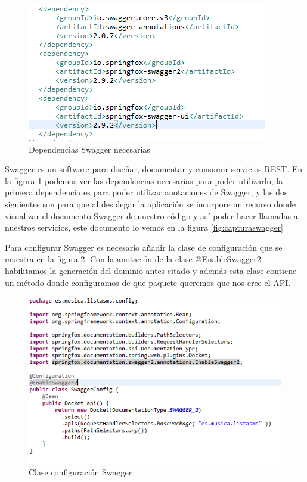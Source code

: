 \documentclass[12pt]{report} %
\begin{document}
\begin{figure}
	\centering
	\includegraphics[width=0.7\linewidth]{imagenes/dependenciasSwagger}
	\caption{Dependencias Swagger necesarias}
	\label{fig:dependenciasswagger}
\end{figure}

Swagger es un software para diseñar, documentar y consumir servicios REST. En la figura \ref{fig:dependenciasswagger} podemos ver las dependencias necesarias para poder utilizarlo, la primera dependencia es para poder utilizar anotaciones de Swagger, y las dos siguientes son para que al desplegar la aplicación se incorpore un recurso donde visualizar el documento Swagger de nuestro código y así poder hacer llamadas a nuestros servicios, este documento lo vemos en la figura \ref{fig:capturaswagger}

Para configurar Swagger es necesario añadir la clase de configuración que se muestra en la figura \ref{fig:cofingswagger}. Con la anotación de la clase @EnableSwagger2 habilitamos la generación del dominio antes citado y además esta clase contiene un método donde configuramos de que paquete queremos que nos cree el API.

\begin{figure}
	\centering
	\includegraphics[width=0.7\linewidth]{imagenes/cofingSwagger}
	\caption{Clase configuración Swagger}
	\label{fig:cofingswagger}
\end{figure}
\end{document}
